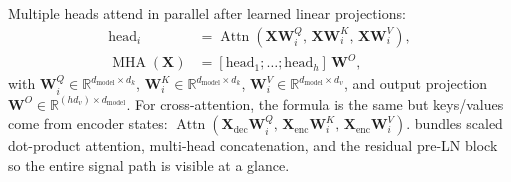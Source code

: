 Multiple heads attend in parallel after learned linear projections:
\begin{equation}
\begin{aligned}
    \mathrm{head}_i &= \operatorname{Attn}(\mathbf{X}\mathbf{W}_i^Q,\, \mathbf{X}\mathbf{W}_i^K,\, \mathbf{X}\mathbf{W}_i^V),\\
    \operatorname{MHA}(\mathbf{X}) &= [\mathrm{head}_1;\ldots;\mathrm{head}_h]\, \mathbf{W}^O,
\end{aligned}
\label{eq:transformers_mha}
\end{equation}
with \(\mathbf{W}_i^Q \in \mathbb{R}^{d_{\text{model}} \times d_k}\), \(\mathbf{W}_i^K \in \mathbb{R}^{d_{\text{model}} \times d_k}\), \(\mathbf{W}_i^V \in \mathbb{R}^{d_{\text{model}} \times d_v}\), and output projection \(\mathbf{W}^O\in\mathbb{R}^{(h d_v)\times d_{\text{model}}}\).
For cross-attention, the formula is the same but keys/values come from encoder states: \(\operatorname{Attn}(\mathbf{X}_{\text{dec}}\mathbf{W}_i^Q,\,\mathbf{X}_{\text{enc}}\mathbf{W}_i^K,\,\mathbf{X}_{\text{enc}}\mathbf{W}_i^V)\).
 bundles scaled dot-product attention, multi-head concatenation, and the residual pre-LN block so the entire signal path is visible at a glance.


